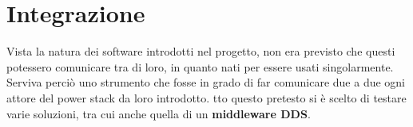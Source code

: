 \section{Integrazione}
Vista la natura dei software introdotti nel progetto, non era previsto che questi potessero comunicare tra di loro, in quanto nati per essere usati singolarmente. Serviva perciò uno strumento che fosse in grado di far comunicare due a due ogni attore del power stack da loro introdotto. 
tto questo pretesto si è scelto di testare varie soluzioni, tra cui anche quella di un \textbf{middleware DDS}. %
